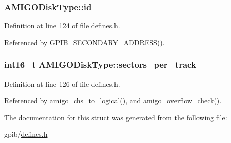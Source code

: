 \subsubsection[{\texorpdfstring{id}{id}}]{ A\+M\+I\+G\+O\+Disk\+Type\+::id}\hypertarget{structAMIGODiskType_a184bee0e5c2958f174c972130c241cbe}{}\label{structAMIGODiskType_a184bee0e5c2958f174c972130c241cbe}


Definition at line 124 of file defines.\+h.



Referenced by G\+P\+I\+B\+\_\+\+S\+E\+C\+O\+N\+D\+A\+R\+Y\+\_\+\+A\+D\+D\+R\+E\+S\+S().

\subsubsection[{\texorpdfstring{sectors\+\_\+per\+\_\+track}{sectors_per_track}}]{\setlength{\rightskip}{0pt plus 5cm}int16\+\_\+t A\+M\+I\+G\+O\+Disk\+Type\+::sectors\+\_\+per\+\_\+track}\hypertarget{structAMIGODiskType_a110284612bb89198e8c9fe31c8dabcba}{}\label{structAMIGODiskType_a110284612bb89198e8c9fe31c8dabcba}


Definition at line 126 of file defines.\+h.



Referenced by amigo\+\_\+chs\+\_\+to\+\_\+logical(), and amigo\+\_\+overflow\+\_\+check().



The documentation for this struct was generated from the following file\+:\begin{DoxyCompactItemize}
\item 
gpib/\hyperlink{defines_8h}{defines.\+h}\end{DoxyCompactItemize}
